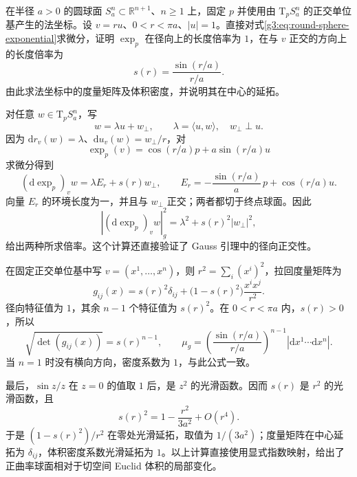 \begin{exercise}\label{g3:ex:sphere-normal-volume}
	在半径 \(a>0\) 的圆球面 \(S_a^n\subset\mathbb R^{n+1}\)、\(n\ge1\) 上，固定 \(p\) 并使用由 \(\mathrm{T}_pS_a^n\) 的正交单位基产生的法坐标。设 \(v=ru\)、\(0<r<\pi a\)、\(|u|=1\)。直接对式\eqref{g3:eq:round-sphere-exponential}求微分，证明 \(\exp_p\) 在径向上的长度倍率为 \(1\)，在与 \(v\) 正交的方向上的长度倍率为
	\[
		s(r)=\frac{\sin(r/a)}{r/a}.
	\]
	由此求法坐标中的度量矩阵及体积密度，并说明其在中心的延拓。
\end{exercise}
\begin{solution}
	对任意 \(w\in\mathrm{T}_pS_a^n\)，写
	\[
		w=\lambda u+w_\perp,\qquad
		\lambda=\langle u,w\rangle,\quad w_\perp\perp u.
	\]
	因为 \(\mathrm{d}r_v(w)=\lambda\)、\(\mathrm{d}u_v(w)=w_\perp/r\)，对
	\[
		\exp_p(v)=\cos(r/a)p+a\sin(r/a)u
	\]
	求微分得到
	\[
		(\mathrm{d}\exp_p)_vw
		=\lambda E_r+s(r)w_\perp,\qquad
		E_r=-\frac{\sin(r/a)}a\,p+\cos(r/a)u.
	\]
	向量 \(E_r\) 的环境长度为一，并且与 \(w_\perp\) 正交；两者都切于终点球面。因此
	\[
		\left|(\mathrm{d}\exp_p)_vw\right|_g^2
		=\lambda^2+s(r)^2|w_\perp|^2,
	\]
	给出两种所求倍率。这个计算还直接验证了 Gauss 引理中的径向正交性。

	在固定正交单位基中写 \(v=(x^1,\ldots,x^n)\)，则 \(r^2=\sum_i(x^i)^2\)，拉回度量矩阵为
	\[
		g_{ij}(x)=s(r)^2\delta_{ij}
		+\bigl(1-s(r)^2\bigr)\frac{x^ix^j}{r^2}.
	\]
	径向特征值为 \(1\)，其余 \(n-1\) 个特征值为 \(s(r)^2\)。在 \(0<r<\pi a\) 内，\(s(r)>0\)，所以
	\[
		\sqrt{\det(g_{ij}(x))}
		=s(r)^{n-1},\qquad
		\mu_g=
		\left(\frac{\sin(r/a)}{r/a}\right)^{n-1}
		\left|\mathrm{d}x^1\cdots\mathrm{d}x^n\right|.
	\]
	当 \(n=1\) 时没有横向方向，密度系数为 \(1\)，与此公式一致。

	最后，\(\sin z/z\) 在 \(z=0\) 的值取 \(1\) 后，是 \(z^2\) 的光滑函数。因而 \(s(r)\) 是 \(r^2\) 的光滑函数，且
	\[
		s(r)^2=1-\frac{r^2}{3a^2}+O(r^4).
	\]
	于是 \((1-s(r)^2)/r^2\) 在零处光滑延拓，取值为 \(1/(3a^2)\)；度量矩阵在中心延拓为 \(\delta_{ij}\)，体积密度系数光滑延拓为 \(1\)。以上计算直接使用显式指数映射，给出了正曲率球面相对于切空间 Euclid 体积的局部变化。
\end{solution}

